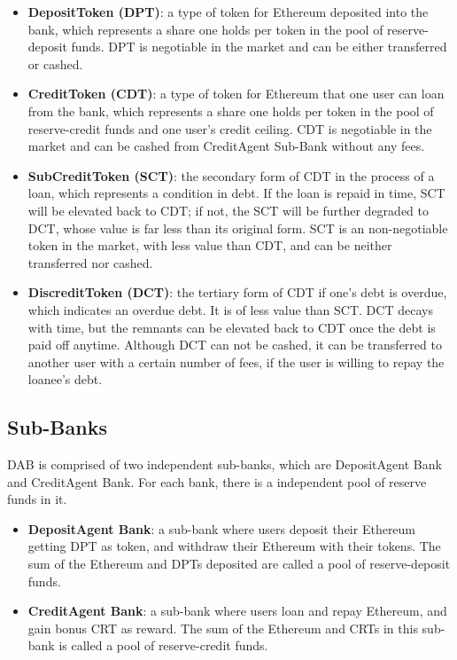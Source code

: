 \documentclass[a4paper, 10pt, conference]{ieeeconf} %
\begin{document}
\begin{itemize} 
   \item \textbf{DepositToken (DPT)}: a type of token for Ethereum deposited into the bank, which represents a share one holds per token in the pool of reserve-deposit funds. DPT is negotiable in the market and can be either transferred or cashed.
   \item  \textbf{CreditToken (CDT)}: a type of token for Ethereum that one user can loan from the bank, which represents a share one holds per token in the pool of reserve-credit funds and one user's credit ceiling. CDT is negotiable in the market and can be cashed from CreditAgent Sub-Bank without any fees.
   \item  \textbf{SubCreditToken (SCT)}: the secondary form of CDT in the process of a loan, which represents a condition in debt. If the loan is repaid in time, SCT will be elevated back to CDT; if not, the SCT will be further degraded to DCT, whose value is far less than its original form. SCT is an non-negotiable token in the market, with less value than CDT, and can be neither transferred nor cashed.
   \item \textbf{DiscreditToken (DCT)}: the tertiary form of CDT if one's debt is overdue, which indicates an overdue debt.  It is of less value than SCT. DCT decays with time, but the remnants can be elevated back to CDT once the debt is paid off anytime. Although DCT can not be cashed, it can be transferred to another user with a certain number of fees, if the user is willing to repay the loanee's debt.
\end{itemize}

\subsection{Sub-Banks}
DAB is comprised of two independent sub-banks, which are DepositAgent Bank and CreditAgent Bank. For each bank, there is a independent pool of reserve funds in it.
\begin{itemize} 
   \item \textbf{DepositAgent Bank}: a sub-bank where users deposit their Ethereum getting DPT as token, and withdraw their Ethereum with their tokens. The sum of the Ethereum and DPTs deposited are called a pool of reserve-deposit funds. 
   \item \textbf{CreditAgent Bank}: a sub-bank where users loan and repay Ethereum, and gain bonus CRT as reward. The sum of the Ethereum and CRTs in this sub-bank is called a pool of reserve-credit funds.
\end{itemize}
\end{document}
